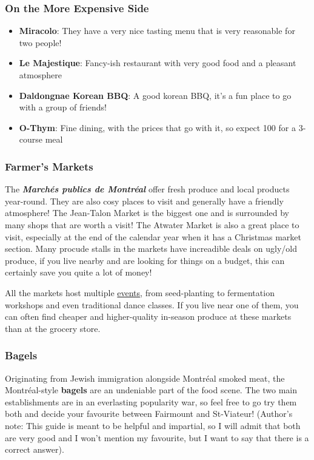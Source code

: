  \subsubsection{On the More Expensive Side}
  \begin{itemize}
    \item \textbf{Miracolo}: They have a very nice tasting menu that is very reasonable for two people!
    \item \textbf{Le Majestique}: Fancy-ish restaurant with very good food and a pleasant atmosphere
    \item \textbf{Daldongnae Korean BBQ}: A good korean BBQ, it's a fun place to go with a group of friends! 
    \item \textbf{O-Thym}: Fine dining, with the prices that go with it, so expect 100 for a 3-course meal
\end{itemize}

  \subsubsection{Farmer's Markets}
  The \textbf{\textit{Marchés publics de Montréal}} offer fresh produce and local products year-round. They are also cosy places to visit and generally have a friendly atmosphere! The Jean-Talon Market is the biggest one and is surrounded by many shops that are worth a visit! The Atwater Market is also a great place to visit, especially at the end of the calendar year when it has a Christmas market section. Many procude stalls in the markets have increadible deals on ugly/old produce, if you live nearby and are looking for things on a budget, this can certainly save you quite a lot of money!
  
  All the markets host multiple \href{https://www.marchespublics-mtl.com/en/events}{events}, from seed-planting to fermentation workshops and even traditional dance classes. If you live near one of them, you can often find cheaper and higher-quality in-season produce at these markets than at the grocery store. 

\subsubsection{Bagels}
Originating from Jewish immigration alongside Montréal smoked meat, the Montréal-style \textbf{bagels} are an undeniable part of the food scene. The two main establishments are in an everlasting popularity war, so feel free to go try them both and decide your favourite between Fairmount and St-Viateur! (Author's note: This guide is meant to be helpful and impartial, so I will admit that both are very good and I won't mention my favourite, but I want to say that there is a correct answer).


